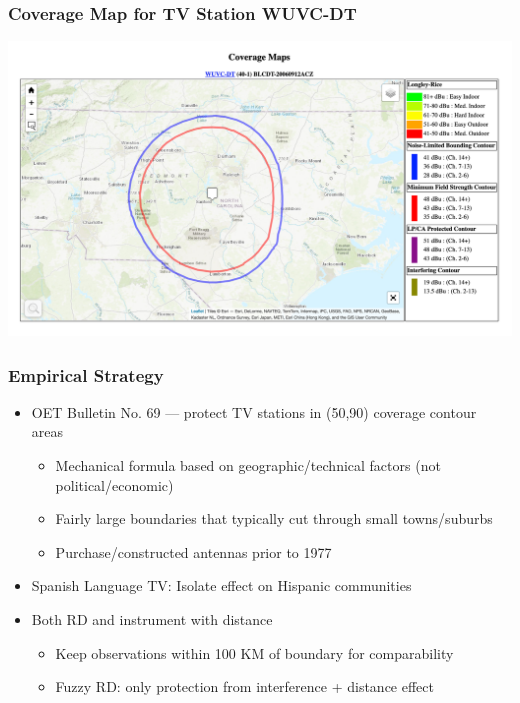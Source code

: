 \documentclass{beamer}
\begin{document}
\begin{frame}
\frametitle{Coverage Map for TV Station WUVC-DT}
\centering
        \includegraphics[width=1\textwidth]{../../analysis/Output/img/ContourExample.png}\\
\end{frame}

\begin{frame}
\frametitle{Empirical Strategy}
\begin{itemize}

\item OET Bulletin No. 69 --- protect TV stations in (50,90) coverage contour areas
\begin{itemize}
\item Mechanical formula based on geographic/technical factors (not political/economic)
\item Fairly large boundaries that typically cut through small towns/suburbs
\item Purchase/constructed antennas prior to 1977
\end{itemize}
\item Spanish Language TV: Isolate effect on Hispanic communities
\item Both RD and instrument with distance
\begin{itemize}
\item Keep observations within 100 KM of boundary for comparability
\item Fuzzy RD: only protection from interference + distance effect
\end{itemize}

\end{itemize}

\end{frame}
\end{document}
